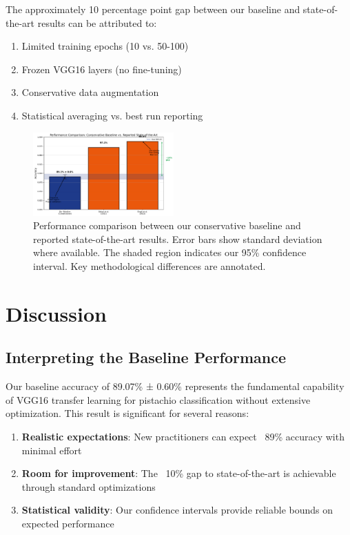 \documentclass[conference]{IEEEtran}
\begin{document}
The approximately 10 percentage point gap between our baseline and state-of-the-art results can be attributed to:
\begin{enumerate}
    \item Limited training epochs (10 vs. 50-100)
    \item Frozen VGG16 layers (no fine-tuning)
    \item Conservative data augmentation
    \item Statistical averaging vs. best run reporting
\end{enumerate}

\begin{figure}[H]
\centering
\includegraphics[width=0.48\textwidth]{figures/performance_comparison.pdf}
\caption{Performance comparison between our conservative baseline and reported state-of-the-art results. Error bars show standard deviation where available. The shaded region indicates our 95\% confidence interval. Key methodological differences are annotated.}
\label{fig:performance_comparison}
\end{figure}

\section{Discussion}

\subsection{Interpreting the Baseline Performance}

Our baseline accuracy of 89.07\% ± 0.60\% represents the fundamental capability of VGG16 transfer learning for pistachio classification without extensive optimization. This result is significant for several reasons:

\begin{enumerate}
    \item \textbf{Realistic expectations}: New practitioners can expect ~89\% accuracy with minimal effort
    \item \textbf{Room for improvement}: The ~10\% gap to state-of-the-art is achievable through standard optimizations
    \item \textbf{Statistical validity}: Our confidence intervals provide reliable bounds on expected performance
\end{enumerate}
\end{document}

